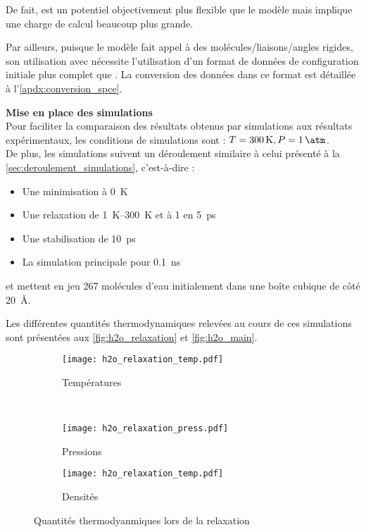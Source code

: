 De fait, \reaxff{} est un potentiel objectivement plus flexible que le modèle \spce{} mais implique une charge de calcul beaucoup plus grande.

Par ailleurs, puisque le modèle \spce{} fait appel à des molécules/liaisons/angles rigides, son utilisation avec \lammps{} nécessite l'utilisation d'un format de données de configuration initiale plus complet que \reaxff{}. La conversion des données dans ce format est détaillée à l'\autoref{apdx:conversion_spce}.

\textbf{Mise en place des simulations}\\
Pour faciliter la comparaison des résultats obtenus par simulations aux résultats expérimentaux, les conditions de simulations sont : $T = \qty{300}{\kelvin}, P = \qty{1}{\atm}$.\\
De plus, les simulations suivent un déroulement similaire à celui présenté à la \autoref{sec:deroulement_simulations}, c'est-à-dire :
\begin{itemize}
    \item Une minimisation à \qty{0}{\kelvin}
    \item Une relaxation de \qtyrange{1}{300}{\kelvin} et à \qty{1}{\atm} en \qty{5}{\pico \second}
    \item Une stabilisation de \qty{10}{\pico \second}
    \item La simulation principale pour \qty{0.1}{\nano \second}
\end{itemize}
et mettent en jeu \num{267} molécules d'eau initialement dans une boîte cubique de côté \qty{20}{\angstrom}.

Les différentes quantités thermodynamiques relevées au cours de ces simulations sont présentées aux \autoref{fig:h2o_relaxation} et \ref{fig:h2o_main}.

\begin{figure}[h!]
    \centering
    \begin{subfigure}{.49\textwidth}
        \texttt{[image: h2o\_relaxation\_temp.pdf]}
        \caption{Températures}
    \end{subfigure}%
    ~
    \begin{subfigure}{.49\textwidth}
        \texttt{[image: h2o\_relaxation\_press.pdf]}
        \caption{Pressions}
    \end{subfigure}
    \begin{subfigure}{.49\textwidth}
        \texttt{[image: h2o\_relaxation\_temp.pdf]}
        \caption{Densités}
    \end{subfigure}
    \caption{Quantités thermodyanmiques lors de la relaxation}
    \label{fig:h2o_relaxation}
\end{figure}

